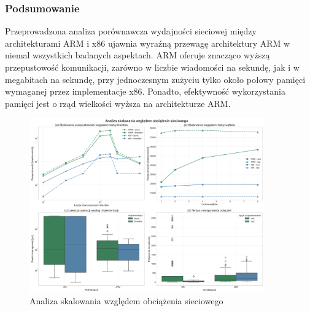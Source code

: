 \subsubsection{Podsumowanie}
Przeprowadzona analiza porównawcza wydajności sieciowej między architekturami ARM i x86 ujawnia wyraźną przewagę architektury ARM w niemal wszystkich badanych aspektach. ARM oferuje znacząco wyższą przepustowość komunikacji, zarówno w liczbie wiadomości na sekundę, jak i w megabitach na sekundę, przy jednoczesnym zużyciu tylko około połowy pamięci wymaganej przez implementacje x86. Ponadto, efektywność wykorzystania pamięci jest o rząd wielkości wyższa na architekturze ARM.

\begin{figure}[H]
    \centering
    \includegraphics[width=0.9\textwidth]{analiza/images/conc/echo/compare/rysunek_2_skalowanie_obciazenia.png}
    \caption{Analiza skalowania względem obciążenia sieciowego}
    \label{rysunek_2_skalowanie_obciazenia}
\end{figure}
